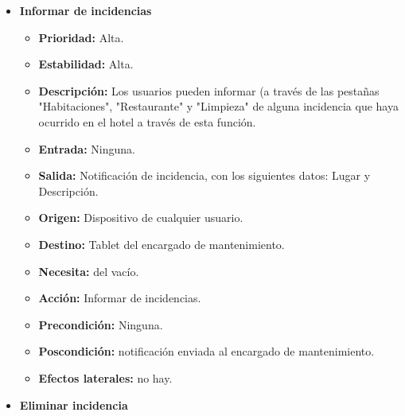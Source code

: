 \documentclass[spanish,a4paper,11pt, twoside]{report}	%
\begin{document}
\begin{itemize}
\begin{itemize}
		\end{itemize}%

\item \textbf{Informar de incidencias} %

		\begin{itemize}

			\item \textbf{Prioridad: }Alta.
			\item \textbf{Estabilidad: }Alta.
			\item \textbf{Descripción: }Los usuarios pueden informar (a través de las pestañas "Habitaciones", "Restaurante" y "Limpieza" de alguna incidencia que haya ocurrido en el hotel a través de esta función.
			\item \textbf{Entrada: }Ninguna.
			\item \textbf{Salida: }Notificación de incidencia, con los siguientes datos: Lugar y Descripción.
			\item \textbf{Origen: }Dispositivo de cualquier usuario.
			\item \textbf{Destino: }Tablet del encargado de mantenimiento.
			\item \textbf{Necesita: }del vacío.
			\item \textbf{Acción: }Informar de incidencias.
			\item \textbf{Precondición: }Ninguna.
			\item \textbf{Poscondición: }notificación enviada al encargado de mantenimiento.
			\item \textbf{Efectos laterales: }no hay.

		\end{itemize}%

\item \textbf{Eliminar incidencia} %

		\begin{itemize}


\end{itemize}
\end{itemize}
\end{document}
